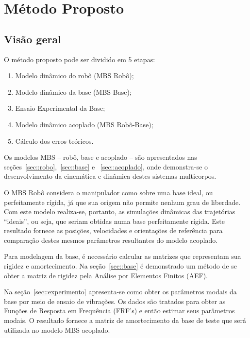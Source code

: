 \chapter{Método Proposto}



\section{Visão geral}

O método proposto pode ser dividido em 5 etapas:
%
\begin{enumerate}
  \item Modelo dinâmico do robô (MBS Robô);
  \item Modelo dinâmico da base (MBS Base);
  \item Ensaio Experimental da Base;
  \item Modelo dinâmico acoplado (MBS Robô-Base);
  \item Cálculo dos erros teóricos.
\end{enumerate}

Os modelos MBS -- robô, base e  acoplado -- são apresentados nas
seções~\ref{sec::robo},~\ref{sec::base} e ~\ref{sec::acoplado}, onde
demonstra-se o desenvolvimento da cinemática e dinâmica destes sistemas
multicorpos.


O MBS Robô considera o manipulador como sobre uma base ideal, ou perfeitamente
rígida, já que sua origem não permite nenhum grau de liberdade.
Com este modelo realiza-se, portanto, as simulações dinâmicas das trajetórias
``ideais'', ou seja, que seriam obtidas numa base perfeitamente rígida. Este
resultado fornece as posições, velocidades e orientações de referência para
comparação destes mesmos parâmetros resultantes do modelo acoplado.

Para modelagem da base, é necessário calcular as matrizes que representam sua
rigidez e amortecimento. Na seção~\ref{sec::base} é demonstrado um método de se
obter a matriz de rigidez pela Análise por Elementos Finitos (AEF).

Na seção~\ref{sec::experimento} apresenta-se como obter os parâmetros modais da
base por meio de ensaio de vibrações. Os dados são tratados para obter as
Funções de Resposta em Frequência (FRF's) e então estimar seus parâmetros
modais. O resultado fornece a matriz de amortecimento da base de teste que será
utilizada no modelo MBS acoplado.

